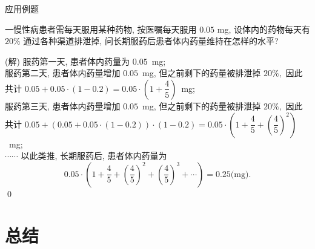 
\begin{frame}{应用例题}

\begin{eg}
一慢性病患者需每天服用某种药物, 按医嘱每天服用 $0.05$ mg, 设体内的药物每天有 $20\%$ 通过各种渠道排泄掉, 问长期服药后患者体内药量维持在怎样的水平?
\end{eg}

\pause

\startproof[bg=yellow, fg=red](解)
服药第一天, 患者体内药量为 $0.05$~mg; \\
\pause
服药第二天, 患者体内药量增加 $0.05$~mg, 但之前剩下的药量被排泄掉 $20\%,$ 因此共计 $0.05 + 0.05\cdot(1-0.2) = 0.05\cdot\left(1 + \dfrac{4}{5}\right)$~mg;\\
\pause
服药第三天, 患者体内药量增加 $0.05$~mg, 但之前剩下的药量被排泄掉 $20\%,$ 因此共计 $0.05 + (0.05 + 0.05\cdot(1-0.2))\cdot(1-0.2) = 0.05\cdot\left(1 + \dfrac{4}{5} + \left( \dfrac{4}{5} \right)^2\right)$~mg;\\
\pause
$\cdots\cdots$ 以此类推, 长期服药后, 患者体内药量为
\[0.05\cdot\left(1 + \dfrac{4}{5} + \left( \dfrac{4}{5} \right)^2 + \left( \dfrac{4}{5} \right)^3 + \cdots \right) = 0.25 \text{(mg)}.\]
\qed

\end{frame}


\section{总结}


